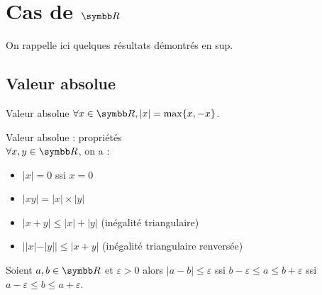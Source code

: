 \section{Cas de \texorpdfstring{$\R$}{R}}

On rappelle ici quelques résultats démontrés en sup.

\subsection{Valeur absolue}


\begin{definition}{Valeur absolue}{}
    $\forall x \in \R, |x| = \max\{x, -x\}$.
\end{definition}

\begin{proposition}{Valeur absolue : propriétés}{}
    \\$\forall x, y \in \R$, on a : 

    \begin{itemize}
        \item $|x| = 0$ ssi $x = 0$
        \item $|xy| = |x| \times |y|$
        \item $|x + y| \leqslant |x| + |y|$ (inégalité triangulaire)
        \item $ | |x| - |y| | \leqslant |x + y|$ (inégalité triangulaire renversée)
    \end{itemize}
\end{proposition}

\begin{exemple}
    Soient $a, b \in \R$ et $\varepsilon > 0$ alors 
    $|a - b| \leqslant \varepsilon$ ssi $b - \varepsilon \leqslant a \leqslant b + \varepsilon$
    ssi $a - \varepsilon \leqslant b \leqslant a + \varepsilon$.
\end{exemple}

